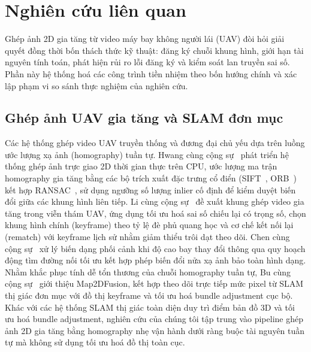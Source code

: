 \section{Nghiên cứu liên quan}
\label{sec:related_work}

Ghép ảnh 2D gia tăng từ video máy bay không người lái (UAV) đòi hỏi giải quyết đồng thời bốn thách thức kỹ thuật: đăng ký chuỗi khung hình, giới hạn tài nguyên tính toán, phát hiện rủi ro lỗi đăng ký và kiểm soát lan truyền sai số. Phần này hệ thống hoá các công trình tiền nhiệm theo bốn hướng chính và xác lập phạm vi so sánh thực nghiệm của nghiên cứu.

\subsection{Ghép ảnh UAV gia tăng và SLAM đơn mục}
Các hệ thống ghép video UAV truyền thống và đương đại chủ yếu dựa trên luồng ước lượng xạ ảnh (homography) tuần tự. Hwang cùng cộng sự~\cite{hwang2026} phát triển hệ thống ghép ảnh trực giao 2D thời gian thực trên CPU, ước lượng ma trận homography gia tăng bằng các bộ trích xuất đặc trưng cổ điển (SIFT~\cite{lowe2004}, ORB~\cite{rublee2011}) kết hợp RANSAC~\cite{fischler1981}, sử dụng ngưỡng số lượng inlier cố định để kiểm duyệt biến đổi giữa các khung hình liên tiếp. Li cùng cộng sự~\cite{li2023} đề xuất khung ghép video gia tăng trong viễn thám UAV, ứng dụng tối ưu hoá sai số chiếu lại có trọng số, chọn khung hình chính (keyframe) theo tỷ lệ đè phủ quang học và cơ chế kết nối lại (rematch) với keyframe lịch sử nhằm giảm thiểu trôi dạt theo dõi. Chen cùng cộng sự~\cite{chen2022} xử lý biến dạng phối cảnh khi độ cao bay thay đổi thông qua quy hoạch động tìm đường nối tối ưu kết hợp phép biến đổi nửa xạ ảnh bảo toàn hình dạng. Nhằm khắc phục tính dễ tổn thương của chuỗi homography tuần tự, Bu cùng cộng sự~\cite{map2dfusion} giới thiệu Map2DFusion, kết hợp theo dõi trực tiếp mức pixel từ SLAM thị giác đơn mục với đồ thị keyframe và tối ưu hoá bundle adjustment cục bộ. Khác với các hệ thống SLAM thị giác toàn diện duy trì điểm bản đồ 3D và tối ưu hoá bundle adjustment, nghiên cứu của chúng tôi tập trung vào pipeline ghép ảnh 2D gia tăng bằng homography nhẹ vận hành dưới ràng buộc tài nguyên tuần tự mà không sử dụng tối ưu hoá đồ thị toàn cục.

